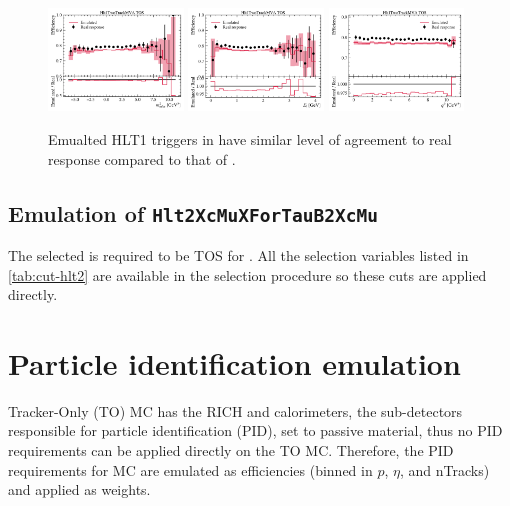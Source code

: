 \begin{figure}[htb]
    \includegraphics[width=0.32\textwidth]{
        ./figs-mc-emulation/emulate-hlt1/b0_Hlt1TwoTrackMVA_TOS_mmiss2.pdf
    }
    \includegraphics[width=0.32\textwidth]{
        ./figs-mc-emulation/emulate-hlt1/b0_Hlt1TwoTrackMVA_TOS_el.pdf
    }
    \includegraphics[width=0.32\textwidth]{
        ./figs-mc-emulation/emulate-hlt1/b0_Hlt1TwoTrackMVA_TOS_q2.pdf
    }

    \caption{
        Emualted HLT1 triggers in \Bz have similar level of agreement to real
        response compared to that of \Bp.
    }
    \label{fig:hlt1-twotrackmva-emu}
\end{figure}


\subsection{Emulation of \texttt{Hlt2XcMuXForTauB2XcMu}}

The selected \B is required to be TOS for .
All the selection variables listed in \cref{tab:cut-hlt2} are available in the
selection procedure so these cuts are applied directly.


\section{Particle identification emulation}
\label{ref:mc-emulation:pid}

Tracker-Only (TO) MC has the RICH and calorimeters,
the sub-detectors responsible for particle identification (PID),
set to passive material, thus no PID requirements can be
applied directly on the TO MC.
Therefore, the PID requirements for MC are emulated as efficiencies (binned in
$p$, $\eta$, and nTracks) and applied as weights.

